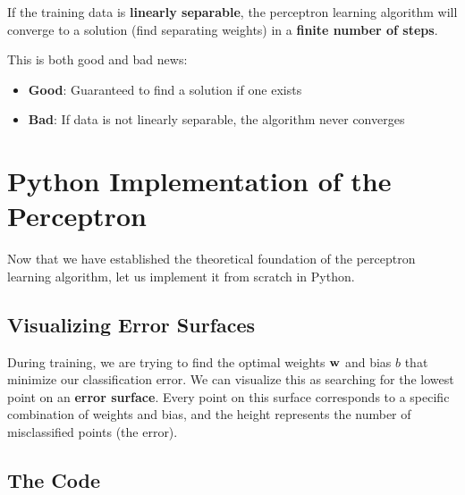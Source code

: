 \begin{theorembox}
If the training data is \textbf{linearly separable}, the perceptron learning algorithm will converge to a solution (find separating weights) in a \textbf{finite number of steps}.
\end{theorembox}

This is both good and bad news:
\begin{itemize}
    \item \textbf{Good}: Guaranteed to find a solution if one exists
    \item \textbf{Bad}: If data is not linearly separable, the algorithm never converges
\end{itemize}


\section{Python Implementation of the Perceptron}

Now that we have established the theoretical foundation of the perceptron learning algorithm, let us implement it from scratch in Python.

\subsection{Visualizing Error Surfaces}

During training, we are trying to find the optimal weights $\mathbf{w}$ and bias $b$ that minimize our classification error. We can visualize this as searching for the lowest point on an \textbf{error surface}. Every point on this surface corresponds to a specific combination of weights and bias, and the height represents the number of misclassified points (the error).

\subsection{The Code}


